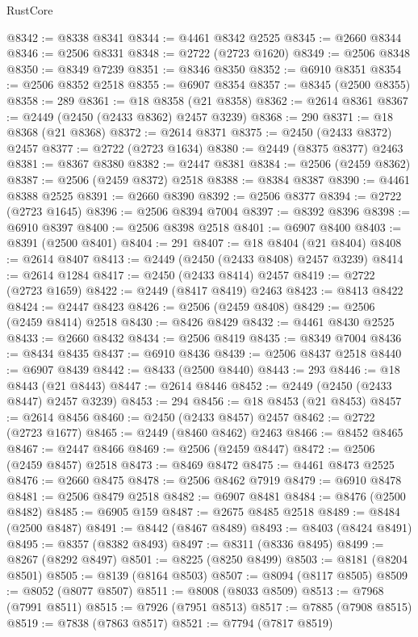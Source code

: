 \begin{lexlean}{RustCore}
\begin{coremodule}
@8342 := @8338 @8341
@8344 := @4461 @8342 @2525
@8345 := @2660 @8344
@8346 := @2506 @8331
@8348 := @2722 (@2723 @1620)
@8349 := @2506 @8348
@8350 := @8349 @7239
@8351 := @8346 @8350
@8352 := @6910 @8351
@8354 := @2506 @8352 @2518
@8355 := @6907 @8354
@8357 := @8345 (@2500 @8355)
@8358 := 289
@8361 := @18 @8358 (@21 @8358)
@8362 := @2614 @8361
@8367 := @2449 (@2450 (@2433 @8362) @2457 @3239)
@8368 := 290
@8371 := @18 @8368 (@21 @8368)
@8372 := @2614 @8371
@8375 := @2450 (@2433 @8372) @2457
@8377 := @2722 (@2723 @1634)
@8380 := @2449 (@8375 @8377) @2463
@8381 := @8367 @8380
@8382 := @2447 @8381
@8384 := @2506 (@2459 @8362)
@8387 := @2506 (@2459 @8372) @2518
@8388 := @8384 @8387
@8390 := @4461 @8388 @2525
@8391 := @2660 @8390
@8392 := @2506 @8377
@8394 := @2722 (@2723 @1645)
@8396 := @2506 @8394 @7004
@8397 := @8392 @8396
@8398 := @6910 @8397
@8400 := @2506 @8398 @2518
@8401 := @6907 @8400
@8403 := @8391 (@2500 @8401)
@8404 := 291
@8407 := @18 @8404 (@21 @8404)
@8408 := @2614 @8407
@8413 := @2449 (@2450 (@2433 @8408) @2457 @3239)
@8414 := @2614 @1284
@8417 := @2450 (@2433 @8414) @2457
@8419 := @2722 (@2723 @1659)
@8422 := @2449 (@8417 @8419) @2463
@8423 := @8413 @8422
@8424 := @2447 @8423
@8426 := @2506 (@2459 @8408)
@8429 := @2506 (@2459 @8414) @2518
@8430 := @8426 @8429
@8432 := @4461 @8430 @2525
@8433 := @2660 @8432
@8434 := @2506 @8419
@8435 := @8349 @7004
@8436 := @8434 @8435
@8437 := @6910 @8436
@8439 := @2506 @8437 @2518
@8440 := @6907 @8439
@8442 := @8433 (@2500 @8440)
@8443 := 293
@8446 := @18 @8443 (@21 @8443)
@8447 := @2614 @8446
@8452 := @2449 (@2450 (@2433 @8447) @2457 @3239)
@8453 := 294
@8456 := @18 @8453 (@21 @8453)
@8457 := @2614 @8456
@8460 := @2450 (@2433 @8457) @2457
@8462 := @2722 (@2723 @1677)
@8465 := @2449 (@8460 @8462) @2463
@8466 := @8452 @8465
@8467 := @2447 @8466
@8469 := @2506 (@2459 @8447)
@8472 := @2506 (@2459 @8457) @2518
@8473 := @8469 @8472
@8475 := @4461 @8473 @2525
@8476 := @2660 @8475
@8478 := @2506 @8462 @7919
@8479 := @6910 @8478
@8481 := @2506 @8479 @2518
@8482 := @6907 @8481
@8484 := @8476 (@2500 @8482)
@8485 := @6905 @159
@8487 := @2675 @8485 @2518
@8489 := @8484 (@2500 @8487)
@8491 := @8442 (@8467 @8489)
@8493 := @8403 (@8424 @8491)
@8495 := @8357 (@8382 @8493)
@8497 := @8311 (@8336 @8495)
@8499 := @8267 (@8292 @8497)
@8501 := @8225 (@8250 @8499)
@8503 := @8181 (@8204 @8501)
@8505 := @8139 (@8164 @8503)
@8507 := @8094 (@8117 @8505)
@8509 := @8052 (@8077 @8507)
@8511 := @8008 (@8033 @8509)
@8513 := @7968 (@7991 @8511)
@8515 := @7926 (@7951 @8513)
@8517 := @7885 (@7908 @8515)
@8519 := @7838 (@7863 @8517)
@8521 := @7794 (@7817 @8519)

\end{coremodule}
\end{lexlean}
